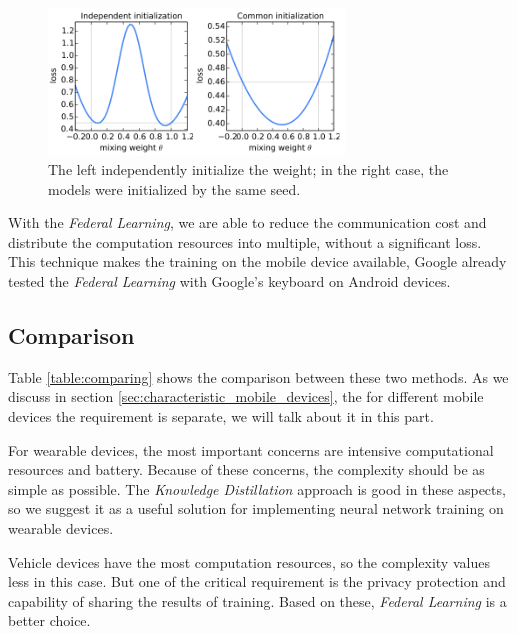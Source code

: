\documentclass[article]{aaltoseries}
\begin{document}
\begin{figure}[t!]
  \begin{center}
    \includegraphics[width=0.7\textwidth]{figures/share_weight}
    \caption{The left independently initialize the weight; in the right case, the models were initialized by the same seed.}
    \label{fig:share_weight}
  \end{center}
\end{figure}

With the \emph{Federal Learning}, we are able to reduce the communication cost and distribute the computation resources into multiple,
without a significant loss.
This technique makes the training on the mobile device available, Google already tested the \emph{Federal Learning} with Google's keyboard
on Android devices\cite{BrendanMcMahanandDanielRamage2017}.


\subsection{Comparison}

Table \ref{table:comparing} shows the comparison between these two methods. 
As we discuss in section \ref{sec:characteristic_mobile_devices}, 
the for different mobile devices the requirement is separate, we will talk about it in this part.

For wearable devices, the most important concerns are intensive computational resources and battery. 
Because of these concerns, the complexity should be as simple as possible. 
The \emph{Knowledge Distillation} approach is good in these aspects, so we suggest it as a useful solution for 
implementing neural network training on wearable devices.

Vehicle devices have the most computation resources, so the complexity values less in this case.
But one of the critical requirement is the privacy protection and capability of sharing the results
of training. Based on these, \emph{Federal Learning} is a better choice.
\end{document}

